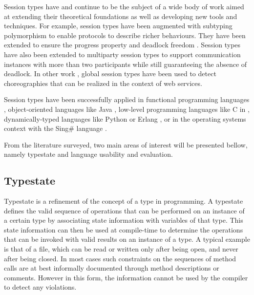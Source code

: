 


Session types have and continue to be the subject of a wide body of work aimed at extending their theoretical foundations as well as developing new tools and techniques. For example, session types have been augmented with subtyping polymorphism to enable protocols to describe richer behaviours\cite{gh05}.
They have been extended to ensure the progress property and deadlock freedom \cite{dyl08}. Session types have also been extended to multiparty session types to support communication instances with more than two participants while still guaranteeing the absence of deadlock\cite{mp08}. In other work \cite{ch07}, global session types have been used to detect choreographies that can be realized in the context of web services. 

Session types have been successfully applied in functional programming languages \cite{v06, bhargavan2009cryptographic}, object-oriented languages like Java \cite{hu2008session, gay2010modular}, low-level programming languages like C in \cite{ng2012multiparty}, dynamically-typed languages like Python\cite{neykova2013session} or Erlang \cite{erlang},  or in the operating systems context with the Sing\# language \cite{singularity}. 


From the literature surveyed, two main areas of interest will be presented bellow, namely typestate and language usability and evaluation.

\subsection{Typestate}





Typestate is a refinement of the concept of a type in programming. A typestate defines the valid sequence of operations that can be performed on an instance of a certain type by associating state information with variables of that type. This state information can then be used at compile-time to determine the operations that can be invoked with valid results on an instance of a type.
A typical example is that of a file, which can be read or written only after being open, and never after being closed. In most cases such constraints on the sequences of method calls are at best informally documented through method descriptions or comments. However in this form, the information cannot be used by the compiler to detect any violations. 


